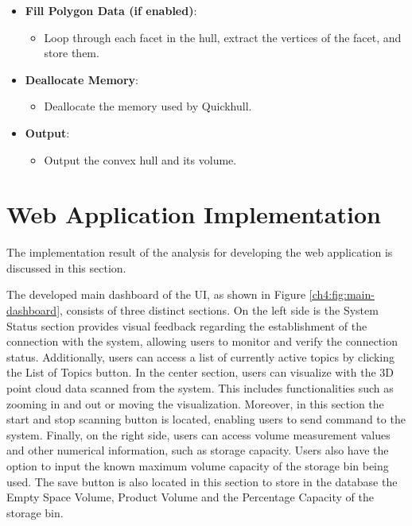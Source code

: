 \begin{itemize}
\begin{itemize}
		      \item Compute the total area and volume of the hull if area and volume computation are enabled.
	      \end{itemize}
	\item \textbf{Fill Polygon Data (if enabled)}:
	      \begin{itemize}
		      \item Loop through each facet in the hull, extract the vertices of the facet, and store them.
	      \end{itemize}
	\item \textbf{Deallocate Memory}:
	      \begin{itemize}
		      \item Deallocate the memory used by Quickhull.
	      \end{itemize}
	\item \textbf{Output}:
	      \begin{itemize}
		      \item Output the convex hull and its volume.
	      \end{itemize}
\end{itemize}

\section{Web Application Implementation}
The implementation result of the analysis for developing the web application is discussed in this section.

The developed main dashboard of the UI, as shown in Figure \ref{ch4:fig:main-dashboard}, consists of three distinct sections. On the left side is the System Status section provides visual feedback regarding the establishment of the connection with the system, allowing users to monitor and verify the connection status. Additionally, users can access a list of currently active topics by clicking the List of Topics button. In the center section, users can visualize with the 3D point cloud data scanned from the system. This includes functionalities such as zooming in and out or moving the visualization. Moreover, in this section the start and stop scanning button is located, enabling users to send command to the system. Finally, on the right side, users can access volume measurement values and other numerical information, such as storage capacity. Users also have the option to input the known maximum volume capacity of the storage bin being used. The save button is also located in this section to store in the database the Empty Space Volume, Product Volume and the Percentage Capacity of the storage bin. \\

